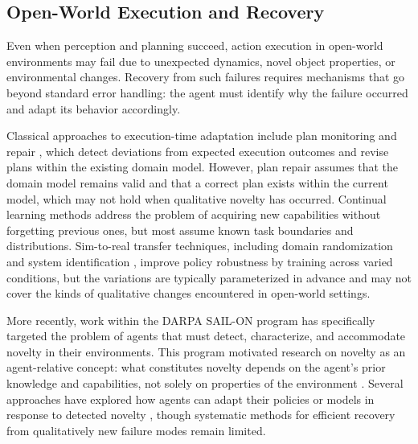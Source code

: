 \subsection{Open-World Execution and Recovery}
\label{sec:rw_execution}

Even when perception and planning succeed, action execution in open-world environments may fail due to unexpected dynamics, novel object properties, or environmental changes. Recovery from such failures requires mechanisms that go beyond standard error handling: the agent must identify why the failure occurred and adapt its behavior accordingly.

Classical approaches to execution-time adaptation include plan monitoring and repair \citep{fox2006plan, fritz2007monitoring}, which detect deviations from expected execution outcomes and revise plans within the existing domain model. However, plan repair assumes that the domain model remains valid and that a correct plan exists within the current model, which may not hold when qualitative novelty has occurred. Continual learning methods \citep{kirkpatrick2017overcoming, rusu2016progressive} address the problem of acquiring new capabilities without forgetting previous ones, but most assume known task boundaries and distributions. Sim-to-real transfer techniques, including domain randomization \citep{tobin2017domain} and system identification \citep{peng2018sim}, improve policy robustness by training across varied conditions, but the variations are typically parameterized in advance and may not cover the kinds of qualitative changes encountered in open-world settings.

More recently, work within the DARPA SAIL-ON program \citep{senator2019science} has specifically targeted the problem of agents that must detect, characterize, and accommodate novelty in their environments. This program motivated research on novelty as an agent-relative concept: what constitutes novelty depends on the agent's prior knowledge and capabilities, not solely on properties of the environment \citep{boult2021towards, langley2020open}. Several approaches have explored how agents can adapt their policies or models in response to detected novelty \citep{balloch2022novgrid, goel2022rapidlearn}, though systematic methods for efficient recovery from qualitatively new failure modes remain limited.
